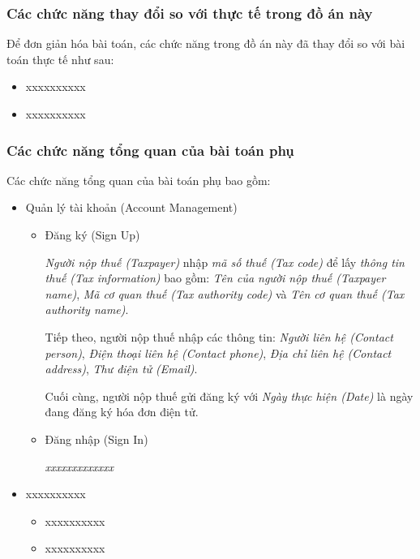 \subsubsection{Các chức năng thay đổi so với thực tế trong đồ án này}

Để đơn giản hóa bài toán, các chức năng trong đồ án này đã thay đổi so với bài toán thực tế như sau:

\begin{itemize}

\item xxxxxxxxxx

\item xxxxxxxxxx

\end{itemize}

\subsubsection{Các chức năng tổng quan của bài toán phụ}

Các chức năng tổng quan của bài toán phụ bao gồm:

\begin{itemize}

\item Quản lý tài khoản (Account Management)

\begin{itemize}

\item Đăng ký (Sign Up)

\emph{Người nộp thuế (Taxpayer)} nhập \emph{mã số thuế (Tax code)} để lấy \emph{thông tin thuế (Tax information)} bao gồm: \emph{Tên của người nộp thuế (Taxpayer name)}, \emph{Mã cơ quan thuế (Tax authority code)} và \emph{Tên cơ quan thuế (Tax authority name)}.

Tiếp theo, người nộp thuế nhập các thông tin: \emph{Người liên hệ (Contact person)}, \emph{Điện thoại liên hệ (Contact phone)}, \emph{Địa chỉ liên hệ (Contact address)}, \emph{Thư điện tử (Email)}.

Cuối cùng, người nộp thuế gửi đăng ký với \emph{Ngày thực hiện (Date)} là ngày đang đăng ký hóa đơn điện tử.

\item Đăng nhập (Sign In)

\emph{xxxxxxxxxxxxx}


\end{itemize}

\item xxxxxxxxxx

\begin{itemize}

\item xxxxxxxxxx

\item xxxxxxxxxx

\end{itemize}

\end{itemize}

